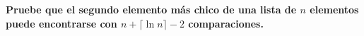 \textbf{Pruebe que el segundo elemento más chico de una lista de $n$ elementos puede encontrarse con $n + \lceil \ln n \rceil - 2$ comparaciones.}\vspace{.2cm}

\textcolor{bibi}{}
\begin{quote}
\end{quote}
